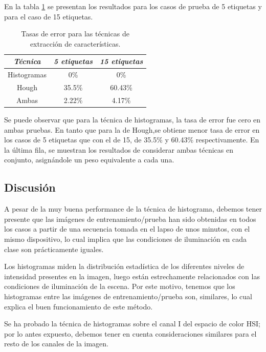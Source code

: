 \documentclass[conference,a4paper,10pt,oneside,final]{tfmpd}
\begin{document}
En la tabla \ref{tablaerrores} se presentan los resultados para
{los casos de prueba} de 5 etiquetas
{y para el caso de} 15 etiquetas.
%
%
\begin{table}
\caption{Tasas de error para {las técnicas de
extracción de características}.}
\begin{center}\begin{tabular}{ccc}
\hline \emph{{Técnica}} & \emph{5 etiquetas} & \emph{15 etiquetas}\\
\hline Histogramas & 0\% & 0\%\\
\hline Hough & 35.5\% & 60.43\%\\
\hline Ambas & 2.22\% & 4.17\%\\
\hline
\end{tabular}\end{center}
\label{tablaerrores}
\end{table}
%
Se puede observar que para {la técnica} de histogramas,
la tasa de error fue cero
en ambas pruebas. En tanto que para {la} de Hough,se obtiene menor tasa de
error {en los casos} de 5 etiquetas que con el de 15, de 35.5\% y 60.43\%
respectivamente. En la última fila, se muestran los resultados de
con\-si\-de\-rar {ambas técnicas}
en conjunto, asignándole un peso equivalente a cada una.
%
%
\subsection{Discusión}
A pesar de la muy buena performance de la técnica de histograma, debemos tener
presente que las  imágenes de entrenamiento/prueba han sido obtenidas
en todos los casos a partir de una secuencia tomada en el
lapso de unos minutos, con el mismo dispositivo, lo cual implica que las
condiciones de iluminación en cada clase son prácticamente iguales.

Los histogramas miden la distribución estadística de los diferentes niveles
de intensidad presentes en la imagen, luego están estrechamente relacionados
con las condiciones de iluminación de la escena. Por este motivo, tenemos
que los histogramas entre las imágenes de entrenamiento/prueba son,
similares, lo cual explica el buen funcionamiento de este método.

Se ha probado la técnica de histogramas sobre el canal I del espacio de color
HSI; por lo antes expuesto, debemos tener en cuenta consideraciones similares
para el resto de los canales de la imagen.
\end{document}
